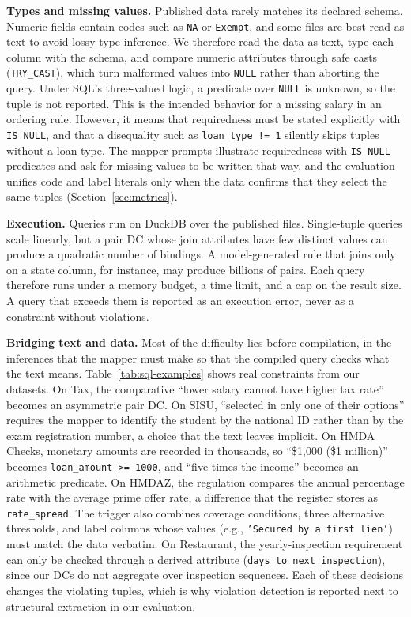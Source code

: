 \smallskip\noindent\textbf{Types and missing values.}
Published data rarely matches its declared schema. Numeric fields contain codes such as \texttt{NA} or \texttt{Exempt}, and some files are best read as text to avoid lossy type inference. We therefore read the data as text, type each column with the schema, and compare numeric attributes through safe casts (\texttt{TRY\_CAST}), which turn malformed values into \texttt{NULL} rather than aborting the query. Under SQL's three-valued logic, a predicate over \texttt{NULL} is unknown, so the tuple is not reported. This is the intended behavior for a missing salary in an ordering rule. However, it means that requiredness must be stated explicitly with \texttt{IS NULL}, and that a disequality such as \texttt{loan\_type != 1} silently skips tuples without a loan type. The mapper prompts illustrate requiredness with \texttt{IS NULL} predicates and ask for missing values to be written that way, and the evaluation unifies code and label literals only when the data confirms that they select the same tuples (Section~\ref{sec:metrics}).

\smallskip\noindent\textbf{Execution.}
Queries run on DuckDB over the published files. Single-tuple queries scale linearly, but a pair DC whose join attributes have few distinct values can produce a quadratic number of bindings. A model-generated rule that joins only on a state column, for instance, may produce billions of pairs. Each query therefore runs under a memory budget, a time limit, and a cap on the result size. A query that exceeds them is reported as an execution error, never as a constraint without violations.

\smallskip\noindent\textbf{Bridging text and data.}
Most of the difficulty lies before compilation, in the inferences that the mapper must make so that the compiled query checks what the text means. Table~\ref{tab:sql-examples} shows real constraints from our datasets. On Tax, the comparative ``lower salary cannot have higher tax rate'' becomes an asymmetric pair DC. On SISU, ``selected in only one of their options'' requires the mapper to identify the student by the national ID rather than by the exam registration number, a choice that the text leaves implicit. On HMDA Checks, monetary amounts are recorded in thousands, so ``\$1,000 (\$1 million)'' becomes \texttt{loan\_amount >= 1000}, and ``five times the income'' becomes an arithmetic predicate. On HMDAZ, the regulation compares the annual percentage rate with the average prime offer rate, a difference that the register stores as \texttt{rate\_spread}. The trigger also combines coverage conditions, three alternative thresholds, and label columns whose values (e.g., \texttt{'Secured by a first lien'}) must match the data verbatim. On Restaurant, the yearly-inspection requirement can only be checked through a derived attribute (\texttt{days\_to\_next\_inspection}), since our DCs do not aggregate over inspection sequences. Each of these decisions changes the violating tuples, which is why violation detection is reported next to structural extraction in our evaluation.

